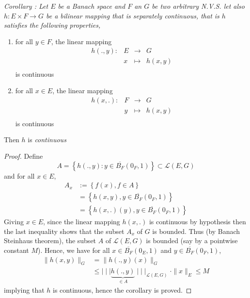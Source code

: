 % 
% 
% 
\lecday[2025-04-24]

% 

\it Corollary : \normalfont 
Let $E $ be a Banach space and $F $ an $G $ be two arbitrary N.V.S. 
let also $ h : E \times F  \longrightarrow G $ be a bilinear mapping that is separately 
continuous, that is $h $ satisfies the following properties, 
\begin{enumerate}[(1)]
\item  for all $y \in  F $, the linear mapping 
	\[
	\begin{array}{cccc}
	      h(.,y)  : &  E  & \longrightarrow & G \\
	
	           &  x  & \longmapsto     & h(x,y)  \\ 
	\end{array}
	\]
	is continuous
\item for all $x \in  E $, the linear mapping 
	\[
	\begin{array}{cccc}
	      h(x,.)  : &    F& \longrightarrow &  G\\
	
	           &y    & \longmapsto     &  h(x,y) \\
	\end{array}
	\]
	is continuous  
\end{enumerate}
Then $h $ is \it continuous \normalfont
\begin{proof}
Define 
\[
A = \left\{ h(., y) : y \in  \overline{B_{F}}(0_{F},1)   \right\} \subset 
\mathcal{L} (E,G) 
\]
and for all $x \in E $, 
\begin{align*}
	A_{x} &:= 
\left\{ f(x) , f \in  A \right\} \\
&= \left\{ h(x,y) , y \in \overline{B_{F}}(0_{F},1)  \right\} \\
&= \left\{ h(x,.)(y), y \in \overline{B_{F}}(0_{F},1)   \right\}
\end{align*}
Giving $x \in E  $, since the linear mapping 
$h(x,.)  $  is continuous by hypothesis then the last
inequality shows that the subset $A_{x} $ of $G $ is bounded. Thus (by Banach
Steinhaus theorem), the subset $A$ of $\mathcal{L} (E,G)  $ is bounded (say
by a pointwise constant $M $). Hence, we have for all 
$x \in  \overline{B_{F}}(0_{E},1)  $ and $y \in \overline{B_{F}}(0_{F},1)$,
\begin{align*}
	\| h(x,y)  \| _{G} &= \| h(.,y)(x)   \| _{G} \\ 
			   & \leq 
			   \mid \mid \mid  
			   \underbrace{
			   h(.,y)
			   }_{ \in A} 
			   \mid \mid \mid _{ \mathcal{L} (E,G) } 
	\cdot \| x \| _{E}  \leq  M
\end{align*}
implying that $h $ is continuous, hence the corollary is proved.
\end{proof}
\divider
